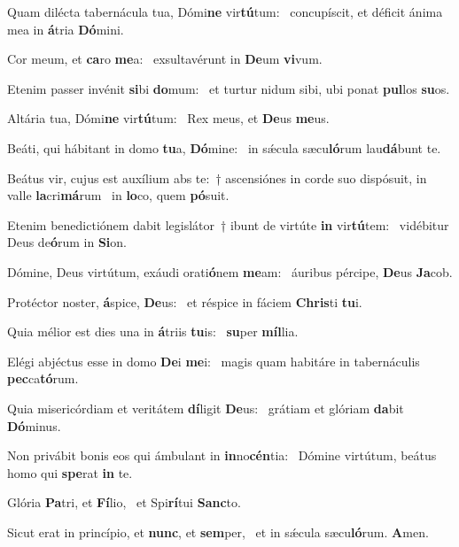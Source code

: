 \item Quam dilécta tabernácula tua, Dómi\textbf{ne} vir\textbf{tú}tum:~\psstar{} concupíscit, et déficit ánima mea in \textbf{á}tria \textbf{Dó}mini.
\item Cor meum, et \textbf{ca}ro \textbf{me}a:~\psstar{} exsultavérunt in \textbf{De}um \textbf{vi}vum.
\item Etenim passer invénit \textbf{si}bi \textbf{do}mum:~\psstar{} et turtur nidum sibi, ubi ponat \textbf{pul}los \textbf{su}os.
\item Altária tua, Dómi\textbf{ne} vir\textbf{tú}\-tum:~\psstar{} Rex meus, et \textbf{De}us \textbf{me}us.
\item Beáti, qui hábitant in domo \textbf{tu}a, \textbf{Dó}mine:~\psstar{} in sǽcula sæcu\textbf{ló}rum lau\textbf{dá}bunt te.
\item Beátus vir, cujus est auxílium abs te:~† ascensiónes in corde suo dispósuit, in valle \textbf{la}cri\textbf{má}rum~\psstar{} in \textbf{lo}co, quem \textbf{pó}suit.
\item Etenim benedictiónem dabit legislátor~† ibunt de virtúte \textbf{in} vir\textbf{tú}tem:~\psstar{} vidébitur Deus de\textbf{ó}rum in \textbf{Si}on.
\item Dómine, Deus virtútum, exáudi orati\textbf{ó}nem \textbf{me}am:~\psstar{} áuribus pércipe, \textbf{De}us \textbf{Ja}cob.
\item Protéctor noster, \textbf{á}spice, \textbf{De}us:~\psstar{} et réspice in fáciem \textbf{Chris}ti \textbf{tu}i.
\item Quia mélior est dies una in \textbf{á}triis \textbf{tu}is:~\psstar{} \textbf{su}per \textbf{míl}lia.
\item Elégi abjéctus esse in domo \textbf{De}i \textbf{me}i:~\psstar{} magis quam habitáre in tabernáculis \textbf{pec}ca\textbf{tó}rum.
\item Quia misericórdiam et veritátem \textbf{dí}ligit \textbf{De}us:~\psstar{} grátiam et glóriam \textbf{da}bit \textbf{Dó}minus.
\item Non privábit bonis eos qui ámbulant in \textbf{in}no\textbf{cén}tia:~\psstar{} Dómine virtútum, beátus homo qui \textbf{spe}rat \textbf{in} te.
\item Glória \textbf{Pa}tri, et \textbf{Fí}lio,~\psstar{} et Spi\textbf{rí}tui \textbf{Sanc}to.
\item Sicut erat in princípio, et \textbf{nunc}, et \textbf{sem}per,~\psstar{} et in sǽcula sæcu\textbf{ló}rum. \textbf{A}men.
